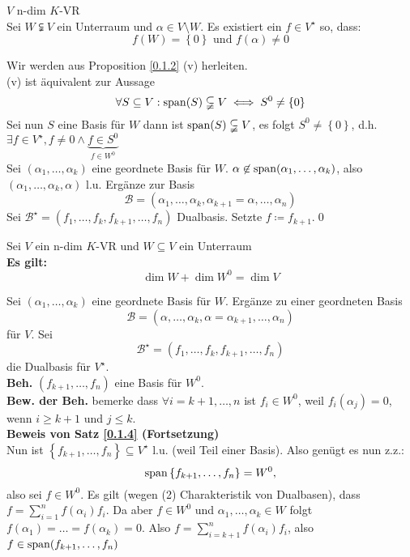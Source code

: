 \begin{subcorollary}
	$ V $ n-dim $ K $-VR\\
	Sei $ W \subsetneqq V $ ein Unterraum und $ \alpha \in V \setminus W $. Es existiert ein $ f \in V^\star $ so, dass:
	\[
		f(W) = \left\{ 0 \right\} \text{ und } f(\alpha) \neq 0
	\]
	
\end{subcorollary}

\begin{subproof*}
	Wir werden aus Proposition \ref{0.1.2} (v) herleiten.\\
	(v) ist äquivalent zur Aussage
	\[
		\forall S \subseteq V : \operatorname{span}(S) \subsetneqq V \iff S^0 \neq \left\{ 0 \right\} 
	\]
	Sei nun $ S $ eine Basis für $ W $ dann ist $ \operatorname{span}(S) \subsetneqq V $, es folgt $ S^0 \neq \left\{ 0 \right\}  $, d.h. $ \exists f \in V^\star, f \neq 0 \wedge \underbrace{f \in S^0}_{f \in W^0} $\\
	Sei $ (\alpha_1, \dotsc, \alpha_k) $ eine geordnete Basis für $ W $.
	$ \alpha \not\in \operatorname{span}(\alpha_1, \dotsc, \alpha_k) $, also $ (\alpha_1, \dotsc, \alpha_k, \alpha) $ l.u. Ergänze zur Basis
	\[
		\mathcal{B} = \left( \alpha_1, \dotsc, \alpha_k, \alpha_{k+1} = \alpha, \dotsc, \alpha_n  \right) 
	\]
	Sei $ \mathcal{B}^\star = (f_1, \dotsc, f_k, f_{k+1}, \dotsc, f_n) $ Dualbasis. Setzte $ f \coloneqq f_{k+1}  $.\qed
\end{subproof*}

\begin{subtheorem}
	Sei $ V $ ein n-dim $ K $-VR und $ W \subseteq V $ ein Unterraum\\
	\textbf{Es gilt:}
	\[
		\dim W + \dim W^0 = \dim V
	\]
	
\end{subtheorem}

\begin{subproof*}
	Sei $ (\alpha_1, \dotsc, \alpha_k) $ eine geordnete Basis für $ W $.
	Ergänze zu einer geordneten Basis
	\[
		\mathcal{B} = (\alpha, \dotsc, \alpha_k, \alpha = \alpha_{k+1} , \dotsc, \alpha_n)
	\]
	für $ V $. Sei
	\[
		\mathcal{B} ^\star = (f_1, \dotsc, f_k, f_{k+1} , \dotsc, f_n)
	\]
	die Dualbasis für $ V^\star $.\\
	\textbf{Beh.} $ (f_{k+1} , \dotsc, f_n) $ eine Basis für $ W^0 $.\\
	\textbf{Bew. der Beh.} bemerke dass $ \forall i = k+1, \dotsc, n $ ist $ f_i \in W^0 $, weil $ f_i(\alpha_j) = 0 $, wenn $ i \geq k + 1 $ und $ j \leq k $.\\
	\textbf{Beweis von Satz \ref{0.1.4} (Fortsetzung)}\\
	Nun ist $ \left\{ f_{k+1} , \dotsc, f_n \right\} \subseteq V^\star $ l.u. (weil Teil einer Basis). 
	Also genügt es nun z.z.:
	\[
		\operatorname{span} \left\{ f_{k+1} ,\dotsc, f_n \right\} = W^0,
	\]
	also sei $ f \in W^0 $. Es gilt (wegen (2) Charakteristik von Dualbasen), dass $ f = \sum_{i=1}^{n} f(\alpha_i) f_i $.
	Da aber $ f \in W^0 $ und $ \alpha_1, \dotsc, \alpha_k \in W $ folgt $ f(\alpha_1) = \dotsc = f(\alpha_k) = 0 $. Also $ f = \sum_{i = k+1}^{n} f(\alpha_i) f_i $, also $ f \in \operatorname{span}(f_{k+1} , \dotsc, f_n) $
\end{subproof*}

